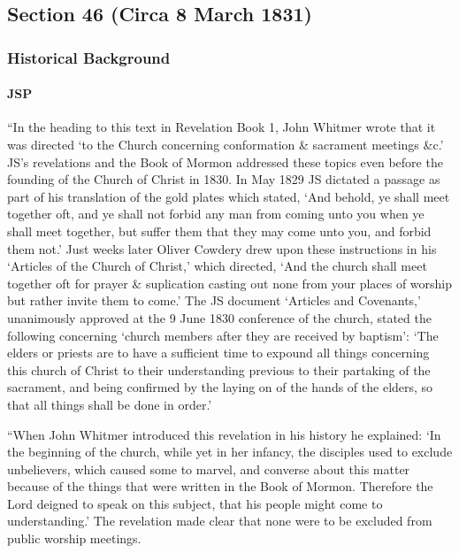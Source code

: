 \subsection{Section 46 (Circa 8 March 1831)}
	\label{DC46}
	
	\subsubsection{Historical Background}
		\label{DC46-HB}
		
		\paragraph{JSP}
		
			``In the heading to this text in Revelation Book 1, John Whitmer wrote that it was directed `to the Church concerning conformation \& sacrament meetings \&c.' JS's revelations and the Book of Mormon addressed these topics even before the founding of the Church of Christ in 1830. In May 1829 JS dictated a passage as part of his translation of the gold plates which stated, `And behold, ye shall meet together oft, and ye shall not forbid any man from coming unto you when ye shall meet together, but suffer them that they may come unto you, and forbid them not.' Just weeks later Oliver Cowdery drew upon these instructions in his `Articles of the Church of Christ,' which directed, `And the church shall meet together oft for prayer \& suplication casting out none from your places of worship but rather invite them to come.' The JS document `Articles and Covenants,' unanimously approved at the 9 June 1830 conference of the church, stated the following concerning `church members after they are received by baptism': `The elders or priests are to have a sufficient time to expound all things concerning this church of Christ to their understanding previous to their partaking of the sacrament, and being confirmed by the laying on of the hands of the elders, so that all things shall be done in order.'
			
			``When John Whitmer introduced this revelation in his history he explained: `In the beginning of the church, while yet in her infancy, the disciples used to exclude unbelievers, which caused some to marvel, and converse about this matter because of the things that were written in the Book of Mormon. Therefore the Lord deigned to speak on this subject, that his people might come to understanding.' The revelation made clear that none were to be excluded from public worship meetings.
			
